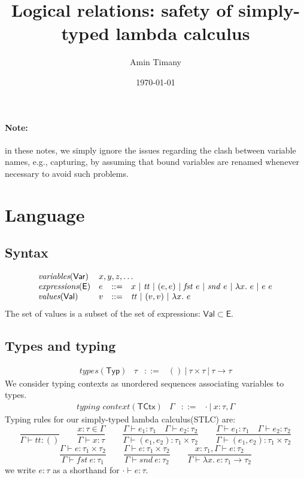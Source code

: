 \documentclass{article}
\title{Logical relations: safety of simply-typed lambda calculus}
\author{Amin Timany}
\date{\today}
\newcommand{\gor}{~|~}
\newcommand{\fst}{\mathit{fst}}
\newcommand{\snd}{\mathit{snd}}
\newcommand{\TT}{\mathit{tt}}
\newcommand{\VAR}{\mathsf{Var}}
\newcommand{\EXP}{\mathsf{E}}
\newcommand{\VAL}{\mathsf{Val}}
\newcommand{\TYP}{\mathsf{Typ}}
\newcommand{\UNT}{()}
\newcommand{\TCTX}{\mathsf{TCtx}}
\begin{document}
\maketitle

\paragraph{Note:} in these notes, we simply ignore the issues
regarding the clash between variable names, e.g., capturing, by
assuming that bound variables are renamed whenever necessary
to avoid such problems.

\section{Language}
\subsection{Syntax}
\[
\begin{array}{llll}
\textit{variables}(\VAR) & \multicolumn{3}{l}{x, y, z, \dots}\\
\textit{expressions}(\EXP) & e &::=& x \gor \TT \gor (e, e)
\gor \fst~e \gor \snd~e \gor \lambda x.~e \gor e~e\\
\textit{values}(\VAL) & v &::=& \TT \gor (v, v) \gor \lambda x.~e
\end{array}
\]
The set of values is a subset of the set of expressions: $\VAL \subset \EXP$.

\subsection{Types and typing}
\[
\begin{array}{llll}
\textit{types}(\TYP) & \tau &::=& \UNT \gor \tau \times \tau 
\gor \tau \to \tau
\end{array}
\]
We consider typing contexts as unordered sequences associating
variables to types.
\[
\begin{array}{llll}
\textit{typing context}(\TCTX) & \Gamma &::=& \cdot \gor x : \tau, \Gamma 
\end{array}
\]
Typing rules for our simply-typed lambda calculus(STLC) are:
\[
\frac{}{\Gamma \vdash \TT : \UNT}
\hspace{2em}
\frac{x : \tau \in \Gamma}{\Gamma \vdash x : \tau}
\hspace{2em}
\frac{\Gamma \vdash e_1 : \tau_1 \hspace{1em}
\Gamma \vdash e_2 : \tau_2}{\Gamma \vdash (e_1, e_2) : \tau_1 \times \tau_2}
\hspace{2em}
\frac{\Gamma \vdash e_1 : \tau_1 \hspace{1em}
\Gamma \vdash e_2 : \tau_2}{\Gamma \vdash (e_1, e_2) : \tau_1 \times \tau_2}
\]
\[
\frac{\Gamma \vdash e : \tau_1 \times \tau_2}{\Gamma \vdash \fst~e : \tau_1}
\hspace{2em}
\frac{\Gamma \vdash e : \tau_1 \times \tau_2}{\Gamma \vdash \snd~e : \tau_2}
\hspace{2em}
\frac{x : \tau_1, \Gamma \vdash e : \tau_2}{\Gamma \vdash \lambda x.~e : \tau_1 \to \tau_2}
\]
we write $e : \tau$ as a shorthand for $\cdot \vdash e : \tau$.
\end{document}
